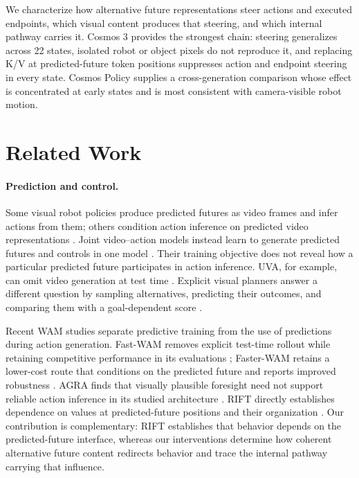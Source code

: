 \documentclass{article}
\begin{document}
We characterize how alternative future representations steer actions and executed endpoints, which visual content produces that steering, and which internal pathway carries it. Cosmos 3 provides the strongest chain: steering generalizes across 22 states, isolated robot or object pixels do not reproduce it, and replacing K/V at predicted-future token positions suppresses action and endpoint steering in every state. Cosmos Policy supplies a cross-generation comparison whose effect is concentrated at early states and is most consistent with camera-visible robot motion.

\section{Related Work}
\label{sec:related}

\paragraph{Prediction and control.}
Some visual robot policies produce predicted futures as video frames and infer actions from them; others condition action inference on predicted video representations \citep{du2023unipi,hu2025vpp}. Joint video--action models instead learn to generate predicted futures and controls in one model \citep{guo2024pad,li2025uva,kim2026cosmospolicy,nvidia2026cosmos3,ye2026dreamzero}. Their training objective does not reveal how a particular predicted future participates in action inference. UVA, for example, can omit video generation at test time \citep{li2025uva}. Explicit visual planners answer a different question by sampling alternatives, predicting their outcomes, and comparing them with a goal-dependent score \citep{ebert2018visualforesight,du2024videolanguage}.

Recent WAM studies separate predictive training from the use of predictions during action generation. Fast-WAM removes explicit test-time rollout while retaining competitive performance in its evaluations \citep{yuan2026fastwam}; Faster-WAM retains a lower-cost route that conditions on the predicted future and reports improved robustness \citep{zhao2026fasterwam}. AGRA finds that visually plausible foresight need not support reliable action inference in its studied architecture \citep{qiu2026agra}. RIFT directly establishes dependence on values at predicted-future positions and their organization \citep{zhang2026rift}. Our contribution is complementary: RIFT establishes that behavior depends on the predicted-future interface, whereas our interventions determine how coherent alternative future content redirects behavior and trace the internal pathway carrying that influence.
\end{document}
